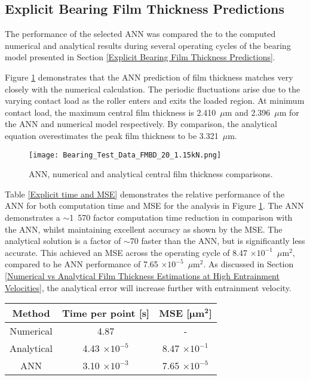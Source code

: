 \subsection{Explicit Bearing Film Thickness Predictions}

The performance of the selected ANN was compared the to the computed numerical and analytical results during several operating cycles of the bearing model presented in Section \ref{Explicit Bearing Film Thickness Predictions}.

Figure \ref{ANN Film Thickness Comparisons} demonstrates that the ANN prediction of film thickness matches very closely with the numerical calculation. The periodic fluctuations arise due to the varying contact load as the roller enters and exits the loaded region. At minimum contact load, the maximum central film thickness is 2.410~$\mu \mathrm{m}$ and 2.396~$\mu \mathrm{m}$ for the ANN and numerical model respectively. By comparison, the analytical equation overestimates the peak film thickness to be 3.321~$\mu \mathrm{m}$.

\begin{figure}
	\centering
	\texttt{[image: Bearing\_Test\_Data\_FMBD\_20\_1.15kN.png]}
	\caption{ANN, numerical and analytical central film thickness comparisons.}
	\label{ANN Film Thickness Comparisons}
\end{figure}

Table \ref{Explicit time and MSE} demonstrates the relative performance of the ANN for both computation time and MSE for the analysis in Figure \ref{ANN Film Thickness Comparisons}. The ANN demonstrates a $\sim$1~570 factor computation time reduction in comparison with the ANN, whilst maintaining excellent accuracy as shown by the MSE. The analytical solution is a factor of $\sim$70 faster than the ANN, but is significantly less accurate. This achieved an MSE across the operating cycle of 8.47 $\times 10^{-1}$~$\mu \mathrm{m}^2$, compared to he ANN performance of 7.65 $\times 10^{-5}$~$\mu \mathrm{m}^2$. As discussed in Section \ref{Numerical vs Analytical Film Thickness Estimations at High Entrainment Velocities}, the analytical error will increase further with entrainment velocity.

\begin{table*}
	\caption{Film thickness computation methodology performance relative to the numerical solution}
	\label{Explicit time and MSE}
	\centering
	\renewcommand{\arraystretch}{1.5}%
	\begin{tabular}{|c|c|c|}	
		\hline \textbf{Method} & \textbf{Time per point [$\mathbf{s}$]} & \textbf{MSE [$\bm{\mu}\mathbf{{m}^2}$]} \\
		\hline Numerical & 4.87 & - \\
		\hline Analytical & 4.43 $\times 10^{-5}$ & 8.47 $\times 10^{-1}$ \\
		\hline ANN & 3.10 $\times 10^{-3}$ & 7.65 $\times 10^{-5}$ \\
		\hline
	\end{tabular}
\end{table*}

